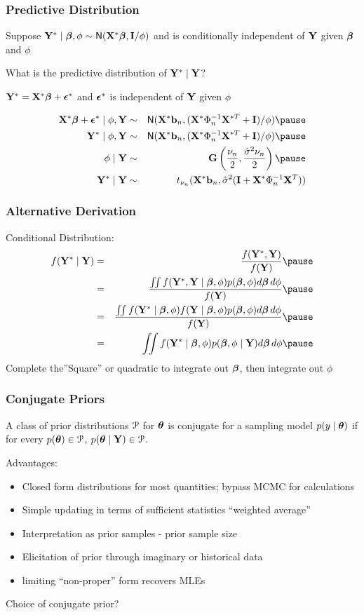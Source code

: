 \documentclass[handout]{beamer}
\begin{document}
\begin{frame}
  \frametitle{Predictive Distribution}
Suppose $\mathbf{Y}^* \mid \boldsymbol{\beta}, \phi \sim \textsf{N}(\mathbf{X}^* \boldsymbol{\beta} , \mathbf{I}/\phi)$  and is conditionally
independent of $\mathbf{Y}$ given $\boldsymbol{\beta}$ and $\phi$ \pause
\vspace{18pt}

What is the predictive distribution of $\mathbf{Y}^* \mid \mathbf{Y}$? \pause

\vspace{18pt}
$\mathbf{Y}^* = \mathbf{X}^* \boldsymbol{\beta} + \boldsymbol{\epsilon}^*$ and $\boldsymbol{\epsilon}^*$ is independent of $\mathbf{Y}$ given
$\phi$ \pause

\begin{eqnarray*}
\X^* \b + \eps^* \mid \phi, \Y & \sim & \N(\X^*\bv_n, (\X^{*} \Phi_n^{-1} \X^{*T}
+ \I)/\phi)  \pause \\
\Y^* \mid \phi, \Y & \sim & \N(\X^*\bv_n, (\X^{*} \Phi_n^{-1} \X^{*T}
+ \I)/\phi)  \pause \\
\phi \mid \Y & \sim & \G\left(\frac{\nu_n}{2},
  \frac{\shat \nu_n}{ 2} \right)  \pause \\
\Y^* \mid \Y & \sim & t_{\nu_n}( \X^*\bv_n, \shat (\I + \X^* \Phi_n^{-1} \X^T))
\end{eqnarray*}
\end{frame}
\begin{frame}
  \frametitle{Alternative Derivation}
Conditional Distribution:
\begin{eqnarray*}
f(\Y^* \mid \Y) & = & \frac{f(\Y^*, \Y)}{f(\Y)} \pause \\
 & = & \frac{
\iint f(\Y^*, \Y \mid \b, \phi) p(\b, \phi) d\b\, d\phi
}
{
  f(\Y)
}  \pause \\
 & = & \frac{
\iint f(\Y^*\mid \b, \phi) f(\Y \mid \b, \phi) p(\b, \phi) d\b\, d\phi
}
{
  f(\Y)
}  \pause \\
 & = & 
\iint f(\Y^*\mid \b, \phi)  p(\b, \phi \mid \Y) d\b\, d\phi \pause
\end{eqnarray*}
Complete the''Square'' or quadratic to integrate out $\boldsymbol{\beta}$, then integrate out $\phi$
\end{frame}

\begin{frame}
  \frametitle{Conjugate Priors}
  \begin{definition}
    A class of prior distributions ${\cal{P}}$ for $\boldsymbol{\theta}$ is conjugate for a
    sampling model $p(y \mid \boldsymbol{\theta})$ if for every $p(\boldsymbol{\theta}) \in {\cal{P}}$, $p(\boldsymbol{\theta}
    \mid \mathbf{Y}) \in {\cal{P}}$.
  \end{definition}
\pause  
  Advantages: \pause
  \begin{itemize}
  \item Closed form distributions for most quantities; bypass MCMC for
    calculations \pause
  \item Simple updating in terms of sufficient statistics ``weighted
    average'' \pause
  \item Interpretation as prior samples - prior sample size \pause
  \item Elicitation of prior through imaginary or historical data \pause
  \item limiting ``non-proper'' form recovers MLEs \pause
  \end{itemize}
Choice of conjugate prior?
\end{frame}
\end{document}
